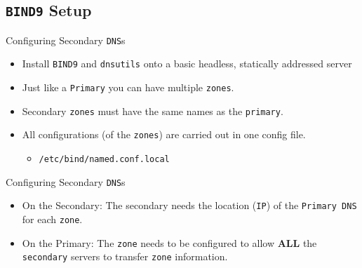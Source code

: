 \documentclass[xcolor=table]{beamer}
\begin{document}
\subsection{\texttt{BIND9} Setup}
\begin{frame}{Configuring Secondary \texttt{DNS}s}
  \begin{itemize}
    \item Install \texttt{BIND9} and \texttt{dnsutils} onto a basic headless, statically addressed server
    \item Just like a \texttt{Primary} you can have multiple \texttt{zones}.
    \item Secondary \texttt{zones} must have the same names as the \texttt{primary}.
    \item All configurations (of the \texttt{zones}) are carried out in one config file.
      \begin{itemize}
        \item \texttt{/etc/bind/named.conf.local}
      \end{itemize}
  \end{itemize}
\end{frame}

\begin{frame}{Configuring Secondary \texttt{DNS}s}
  \begin{itemize}
    \item On the Secondary: The secondary needs the location (\texttt{IP}) of the \texttt{Primary DNS} for each \texttt{zone}.
    \item On the Primary: The \texttt{zone} needs to be configured to allow \textbf{ALL} the \texttt{secondary} servers to transfer \texttt{zone} information.
  \end{itemize}
\end{frame}
\end{document}
